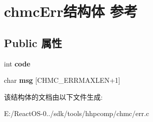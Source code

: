 \hypertarget{structchmc_err}{}\section{chmc\+Err结构体 参考}
\label{structchmc_err}
\subsection*{Public 属性}
\begin{DoxyCompactItemize}
\item 
\mbox{\label{structchmc_err_a53b56e6c88fac643a76c4f06aef65d17}} 
int {\bfseries code}
\item 
\mbox{\label{structchmc_err_ae454e6229934cd9c64847d8ea0dc98f8}} 
char {\bfseries msg} \mbox{[}C\+H\+M\+C\+\_\+\+E\+R\+R\+M\+A\+X\+L\+EN+1\mbox{]}
\end{DoxyCompactItemize}


该结构体的文档由以下文件生成\+:\begin{DoxyCompactItemize}
\item 
E\+:/\+React\+O\+S-\/0../sdk/tools/hhpcomp/chmc/err.\+c\end{DoxyCompactItemize}
